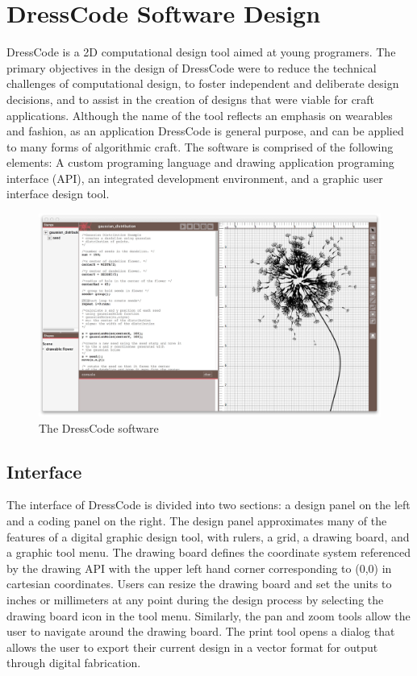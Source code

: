 \documentclass{sigchi}
\begin{document}
\section{DressCode Software Design}
DressCode is a 2D computational design tool aimed at young programers. The primary objectives in the design of DressCode were to reduce the technical challenges of computational design, to foster independent and deliberate design decisions, and to assist in the creation of designs that were viable for craft applications. Although the name of the tool reflects an emphasis on wearables and fashion, as an application DressCode is general purpose, and can be applied to many forms of algorithmic craft. The software is comprised of the following elements: A custom programing language and drawing application programing interface (API), an integrated development environment, and a graphic user interface design tool. 
\begin{center}
\begin{figure}[h!]
\includegraphics[width=\columnwidth]{images/dresscode_interface.jpg}
\caption{The DressCode software}
\label{fig:dresscode_interface}
\end{figure}
\end{center}
\subsection{Interface}
The interface of DressCode is divided into two sections: a design panel on the left and a coding panel on the right. The design panel approximates many of the features of a digital graphic design tool, with rulers, a grid, a drawing board, and a graphic tool menu. The drawing board defines the coordinate system referenced by the drawing API with the upper left hand corner corresponding to (0,0) in cartesian coordinates. Users can resize the drawing board and set the units to inches or millimeters at any point during the design process by selecting the drawing board icon in the tool menu. Similarly, the pan and zoom tools allow the user to navigate around the drawing board. The print tool opens a dialog that allows the user to export their current design in a vector format for output through digital fabrication. 
\end{document}
